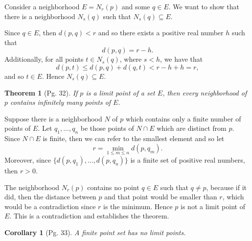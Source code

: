 \documentclass[leqno]{article}
\makeatletter
\newtheorem{theorem}{Theorem}[section]
\newtheorem{corollary}{Corollary}[theorem]
\theoremstyle{definition}
\theoremstyle{remark}
\let\oldproofname=\proofname
\renewcommand{\proofname}{\bf{\textit{\oldproofname}}}
\renewenvironment{proof}[1][\proofname]{\par
  \pushQED{\qed}%
  \normalfont \topsep6\p@\@plus6\p@\relax
  \list{}{\leftmargin=0mm
          \rightmargin=0mm
          \settowidth{\itemindent}{\itshape#1}%
          \labelwidth=4mm
          \parsep=0pt \listparindent=0mm%
  }
  \item[\hskip\labelsep
        \itshape
    #1\@addpunct{.}]\ignorespaces
}{%
  \popQED\endlist\@endpefalse
}
\makeatother
\begin{document}
                \begin{proof}
                    Consider a neighborhood $E=N_r(p)$ and some $q\in E$. We want to show that there is a neighborhood $N_s(q)$ such that $N_s(q)\subseteq E$.\par Since $q\in E$, then $d(p,q)<r$ and so there exists a positive real number $h$ such that 
                        \begin{equation*}
                            d(p,q)=r-h.
                        \end{equation*}
                    Additionally, for all points $t\in N_s(q)$, where $s<h$, we have that 
                        \begin{equation*}
                            d(p,t)\leq d(p,q)+d(q,t)<r-h+h=r,
                        \end{equation*}
                    and so $t\in E$. Hence $N_s(q)\subseteq E$.
                \end{proof}
            \begin{theorem}[Pg. 32]\label{thm:5.2}
                If $p$ is a limit point of a set $E$, then every neighborhood of $p$ contains infinitely many points of $E$. 
            \end{theorem}
                \begin{proof}
                    Suppose there is a neighborhood $N$ of $p$ which contains only a finite number of points of $E$. Let $q_1,\dots,q_n$ be those points of $N\cap E$ which are distinct from $p$. Since $N\cap E$ is finite, then we can refer to the smallest element and so let
                        \begin{equation*}
                            r=\min_{1\leq m\leq n}d(p,q_m).
                        \end{equation*}
                    Moreover, since $\{d(p,q_1),\dots,d(p,q_n)\}$ is a finite set of positive real numbers, then $r>0$.\par The neighborhood $N_r(p)$ contains no point $q\in E$ such that $q\neq p$, because if it did, then the distance between $p$ and that point would be smaller than $r$, which would be a contradiction since $r$ is the minimum. Hence $p$ is not a limit point of $E$. This is a contradiction and establishes the theorem.
                \end{proof}
            \begin{corollary}[Pg. 33]\label{cor:5.2.1}
                A finite point set has no limit points. 
            \end{corollary}
\end{document}
